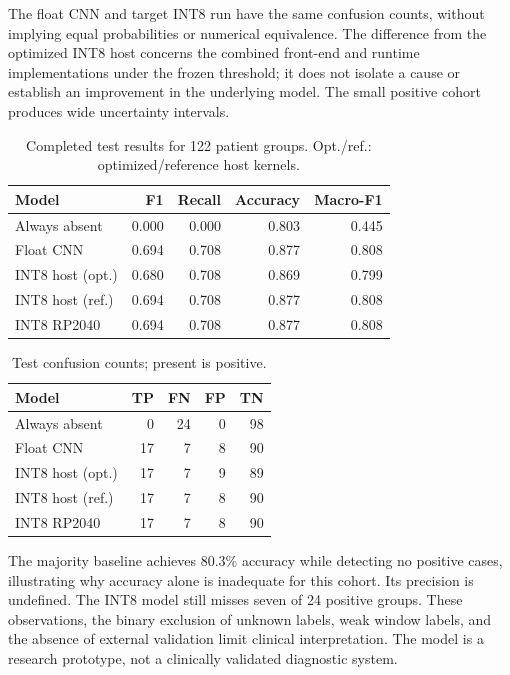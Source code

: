 \documentclass[9pt,twocolumn,twoside,lineno]{MSBJournal}
\begin{document}
The float CNN and target INT8 run have the same confusion counts, without implying equal probabilities or numerical equivalence. The difference from the optimized INT8 host concerns the combined front-end and runtime implementations under the frozen threshold; it does not isolate a cause or establish an improvement in the underlying model. The small positive cohort produces wide uncertainty intervals.
\begin{table}[t]
\centering
\caption{Completed test results for 122 patient groups. Opt./ref.: optimized/reference host kernels.}
\label{tab:predictive}
\begin{tabular}{lrrrr}
\toprule
Model & F1 & Recall & Accuracy & Macro-F1\\
\midrule
Always absent & 0.000 & 0.000 & 0.803 & 0.445\\
Float CNN & 0.694 & 0.708 & 0.877 & 0.808\\
INT8 host (opt.) & 0.680 & 0.708 & 0.869 & 0.799\\
INT8 host (ref.) & 0.694 & 0.708 & 0.877 & 0.808\\
INT8 RP2040 & 0.694 & 0.708 & 0.877 & 0.808\\
\bottomrule
\end{tabular}
\end{table}
\begin{table}[t]
\centering
\caption{Test confusion counts; present is positive.}
\label{tab:confusion}
\begin{tabular}{lrrrr}
\toprule
Model & TP & FN & FP & TN\\
\midrule
Always absent & 0 & 24 & 0 & 98\\
Float CNN & 17 & 7 & 8 & 90\\
INT8 host (opt.) & 17 & 7 & 9 & 89\\
INT8 host (ref.) & 17 & 7 & 8 & 90\\
INT8 RP2040 & 17 & 7 & 8 & 90\\
\bottomrule
\end{tabular}
\end{table}

The majority baseline achieves 80.3\% accuracy while detecting no positive cases, illustrating why accuracy alone is inadequate for this cohort. Its precision is undefined. The INT8 model still misses seven of 24 positive groups. These observations, the binary exclusion of unknown labels, weak window labels, and the absence of external validation limit clinical interpretation. The model is a research prototype, not a clinically validated diagnostic system.
\end{document}
